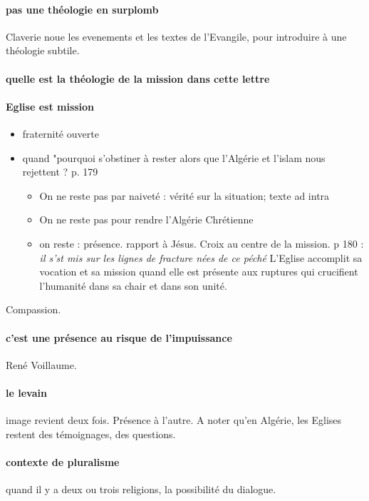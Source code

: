 \paragraph{pas une théologie en surplomb} Claverie noue les evenements et les textes de l'Evangile, pour introduire à une théologie subtile. 

\paragraph{quelle est la théologie de la mission dans cette lettre}
 
\paragraph{Eglise est mission}

\begin{itemize}
    \item fraternité ouverte
    \item quand "pourquoi s'obstiner à rester alors que l'Algérie et l'islam nous rejettent ? p. 179
    \begin{itemize}
        \item On ne reste pas par naiveté : vérité sur la situation; texte ad intra
        \item On ne reste pas pour rendre l'Algérie Chrétienne
        \item on reste : présence. rapport à Jésus. Croix au centre de la mission.  p 180 : \textit{il s'st mis sur les lignes de fracture nées de ce péché}
        L'Eglise accomplit sa vocation et sa mission quand elle est présente aux ruptures qui crucifient l'humanité dans sa chair et dans son unité. 
    \end{itemize}
\end{itemize}

 Compassion. 
 \paragraph{c'est une présence au risque de l'impuissance} René Voillaume. 

 \paragraph{le levain} image revient deux fois. Présence à l'autre. A noter qu'en Algérie, les Eglises restent des témoignages, des questions. 

\paragraph{contexte de pluralisme} quand il y a deux ou trois religions, la possibilité du dialogue. 
